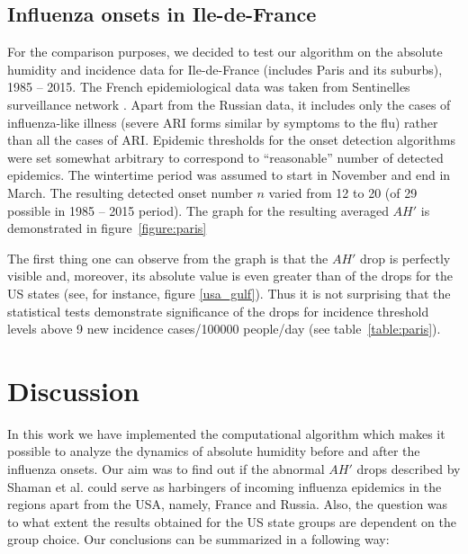 \documentclass[procedia]{easychair}
\begin{document}
\subsection{Influenza onsets in Ile-de-France}
For the comparison purposes, we decided to test our algorithm on the absolute humidity and incidence data for Ile-de-France (includes Paris and its suburbs), 1985 -- 2015. The French epidemiological data was taken from Sentinelles surveillance network \cite{sentinelles}. Apart from the Russian data, it includes only the cases of influenza-like illness (severe ARI forms similar by symptoms to the flu) rather than all the cases of ARI. Epidemic thresholds for the onset detection algorithms were set somewhat arbitrary to correspond to ``reasonable'' number of detected epidemics. The wintertime period was assumed to start in November and end in March. The resulting detected onset number $n$ varied from 12 to 20 (of 29 possible in 1985 -- 2015 period). The graph for the resulting averaged $AH'$ is demonstrated in figure~\ref{figure:paris}

The first thing one can observe from the graph is that the $AH'$ drop is perfectly visible and, moreover, its absolute value is even greater than of the drops for the US states (see, for instance, figure \ref{usa_gulf}). Thus it is not surprising that the statistical tests demonstrate significance of the drops for incidence threshold levels above 9 new incidence cases/100000 people/day (see table~\ref{table:paris}).

\section{Discussion}

In this work we have implemented the computational algorithm which makes it possible to analyze the dynamics of absolute humidity before and after the influenza onsets. Our aim was to find out if the abnormal $AH'$ drops described by Shaman et al. could serve as harbingers of incoming influenza epidemics in the regions apart from the USA, namely, France and Russia. Also, the question was to what extent the results obtained for the US state groups are dependent on the group choice. Our conclusions can be summarized in a following way:
\end{document}
